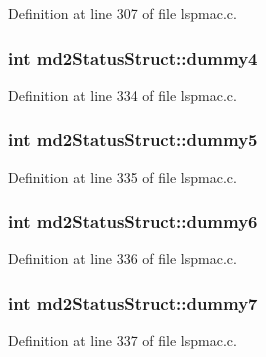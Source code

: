 Definition at line 307 of file lspmac.\-c.

\hypertarget{structmd2StatusStruct_adaa01db9cf77d95756bc3156fb702600}{
\subsubsection[{dummy4}]{\setlength{\rightskip}{0pt plus 5cm}int md2\-Status\-Struct\-::dummy4}}\label{structmd2StatusStruct_adaa01db9cf77d95756bc3156fb702600}


Definition at line 334 of file lspmac.\-c.

\hypertarget{structmd2StatusStruct_af4f8869f8954c6162cae80000c54694f}{
\subsubsection[{dummy5}]{\setlength{\rightskip}{0pt plus 5cm}int md2\-Status\-Struct\-::dummy5}}\label{structmd2StatusStruct_af4f8869f8954c6162cae80000c54694f}


Definition at line 335 of file lspmac.\-c.

\hypertarget{structmd2StatusStruct_a864a2234ede061ec2380230ebf29ce70}{
\subsubsection[{dummy6}]{\setlength{\rightskip}{0pt plus 5cm}int md2\-Status\-Struct\-::dummy6}}\label{structmd2StatusStruct_a864a2234ede061ec2380230ebf29ce70}


Definition at line 336 of file lspmac.\-c.

\hypertarget{structmd2StatusStruct_a91f38d814222edeffa67a6a3ab61f5d6}{
\subsubsection[{dummy7}]{\setlength{\rightskip}{0pt plus 5cm}int md2\-Status\-Struct\-::dummy7}}\label{structmd2StatusStruct_a91f38d814222edeffa67a6a3ab61f5d6}


Definition at line 337 of file lspmac.\-c.

